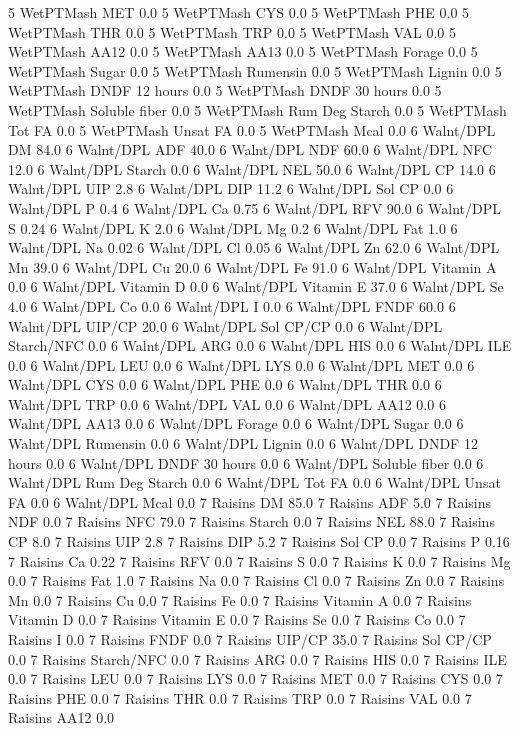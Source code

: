 \documentclass[letterpaper,10pt,english]{sphinxmanual}
\begin{document}
\begin{sphinxVerbatim}[commandchars=\\\{\},numbers=left,firstnumber=1,stepnumber=1]
5 WetPTMash MET 0.0
5 WetPTMash CYS 0.0
5 WetPTMash PHE 0.0
5 WetPTMash THR 0.0
5 WetPTMash TRP 0.0
5 WetPTMash VAL 0.0
5 WetPTMash AA\PYGZsh{}12 0.0
5 WetPTMash AA\PYGZsh{}13 0.0
5 WetPTMash \PYGZpc{} Forage 0.0
5 WetPTMash Sugar \PYGZpc{} 0.0
5 WetPTMash Rumensin 0.0
5 WetPTMash Lignin 0.0
5 WetPTMash DNDF 12 hours 0.0
5 WetPTMash DNDF 30 hours 0.0
5 WetPTMash Soluble fiber 0.0
5 WetPTMash Rum Deg Starch 0.0
5 WetPTMash Tot FA 0.0
5 WetPTMash Unsat FA 0.0
5 WetPTMash Mcal 0.0
6 Walnt/DPL DM 84.0
6 Walnt/DPL ADF 40.0
6 Walnt/DPL NDF 60.0
6 Walnt/DPL NFC 12.0
6 Walnt/DPL Starch 0.0
6 Walnt/DPL NEL 50.0
6 Walnt/DPL CP 14.0
6 Walnt/DPL UIP 2.8
6 Walnt/DPL DIP 11.2
6 Walnt/DPL Sol CP 0.0
6 Walnt/DPL P 0.4
6 Walnt/DPL Ca 0.75
6 Walnt/DPL RFV 90.0
6 Walnt/DPL S 0.24
6 Walnt/DPL K 2.0
6 Walnt/DPL Mg 0.2
6 Walnt/DPL Fat 1.0
6 Walnt/DPL Na 0.02
6 Walnt/DPL Cl 0.05
6 Walnt/DPL Zn 62.0
6 Walnt/DPL Mn 39.0
6 Walnt/DPL Cu 20.0
6 Walnt/DPL Fe 91.0
6 Walnt/DPL Vitamin A 0.0
6 Walnt/DPL Vitamin D 0.0
6 Walnt/DPL Vitamin E 37.0
6 Walnt/DPL Se 4.0
6 Walnt/DPL Co 0.0
6 Walnt/DPL I 0.0
6 Walnt/DPL FNDF 60.0
6 Walnt/DPL UIP/CP 20.0
6 Walnt/DPL Sol CP/CP 0.0
6 Walnt/DPL Starch/NFC 0.0
6 Walnt/DPL ARG 0.0
6 Walnt/DPL HIS 0.0
6 Walnt/DPL ILE 0.0
6 Walnt/DPL LEU 0.0
6 Walnt/DPL LYS 0.0
6 Walnt/DPL MET 0.0
6 Walnt/DPL CYS 0.0
6 Walnt/DPL PHE 0.0
6 Walnt/DPL THR 0.0
6 Walnt/DPL TRP 0.0
6 Walnt/DPL VAL 0.0
6 Walnt/DPL AA\PYGZsh{}12 0.0
6 Walnt/DPL AA\PYGZsh{}13 0.0
6 Walnt/DPL \PYGZpc{} Forage 0.0
6 Walnt/DPL Sugar \PYGZpc{} 0.0
6 Walnt/DPL Rumensin 0.0
6 Walnt/DPL Lignin 0.0
6 Walnt/DPL DNDF 12 hours 0.0
6 Walnt/DPL DNDF 30 hours 0.0
6 Walnt/DPL Soluble fiber 0.0
6 Walnt/DPL Rum Deg Starch 0.0
6 Walnt/DPL Tot FA 0.0
6 Walnt/DPL Unsat FA 0.0
6 Walnt/DPL Mcal 0.0
7 Raisins DM 85.0
7 Raisins ADF 5.0
7 Raisins NDF 0.0
7 Raisins NFC 79.0
7 Raisins Starch 0.0
7 Raisins NEL 88.0
7 Raisins CP 8.0
7 Raisins UIP 2.8
7 Raisins DIP 5.2
7 Raisins Sol CP 0.0
7 Raisins P 0.16
7 Raisins Ca 0.22
7 Raisins RFV 0.0
7 Raisins S 0.0
7 Raisins K 0.0
7 Raisins Mg 0.0
7 Raisins Fat 1.0
7 Raisins Na 0.0
7 Raisins Cl 0.0
7 Raisins Zn 0.0
7 Raisins Mn 0.0
7 Raisins Cu 0.0
7 Raisins Fe 0.0
7 Raisins Vitamin A 0.0
7 Raisins Vitamin D 0.0
7 Raisins Vitamin E 0.0
7 Raisins Se 0.0
7 Raisins Co 0.0
7 Raisins I 0.0
7 Raisins FNDF 0.0
7 Raisins UIP/CP 35.0
7 Raisins Sol CP/CP 0.0
7 Raisins Starch/NFC 0.0
7 Raisins ARG 0.0
7 Raisins HIS 0.0
7 Raisins ILE 0.0
7 Raisins LEU 0.0
7 Raisins LYS 0.0
7 Raisins MET 0.0
7 Raisins CYS 0.0
7 Raisins PHE 0.0
7 Raisins THR 0.0
7 Raisins TRP 0.0
7 Raisins VAL 0.0
7 Raisins AA\PYGZsh{}12 0.0

\end{sphinxVerbatim}
\end{document}
